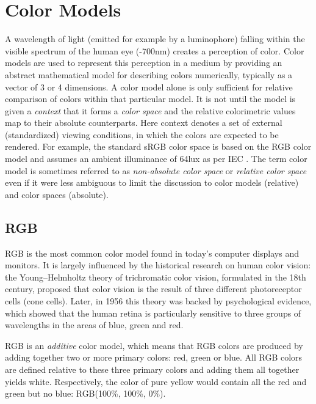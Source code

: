 \documentclass[thesis.tex]{subfiles}
\begin{document}
\section{Color Models}
\label{section:rgbhsv}

A wavelength of light (emitted for example by a luminophore) falling within the visible spectrum of the human eye (-700nm) creates a perception of color. Color models are used to represent this perception in a medium by providing an abstract mathematical model for describing colors numerically, typically as a vector of 3 or 4 dimensions. A color model alone is only sufficient for relative comparison of colors within that particular model. It is not until the model is given a \textit{context} that it forms a \textit{color space} and the relative colorimetric values map to their absolute counterparts. Here context denotes a set of external (standardized) viewing conditions, in which the colors are expected to be rendered. For example, the standard sRGB color space is based on the RGB color model and assumes an ambient illuminance of 64lux as per IEC \cite{iec}. The term color model is sometimes referred to as \textit{non-absolute color space} or \textit{relative color space} even if it were less ambiguous to limit the discussion to color models (relative) and color spaces (absolute).

\subsection{RGB}
RGB is the most common color model found in today's computer displays and monitors. It is largely influenced by the historical research on human color vision: the Young–Helmholtz theory of trichromatic color vision, formulated in the 18th century, proposed that color vision is the result of three different photoreceptor cells (cone cells). Later, in 1956 this theory was backed by psychological evidence, which showed that the human retina is particularly sensitive to three groups of wavelengths in the areas of blue, green and red. \cite{svaetichin}

RGB is an \textit{additive} color model, which means that RGB colors are produced by adding together two or more primary colors: red, green or blue. All RGB colors are defined relative to these three primary colors and adding them all together yields white. Respectively, the color of pure yellow would contain all the red and green but no blue: RGB(100\%, 100\%, 0\%).
\end{document}
